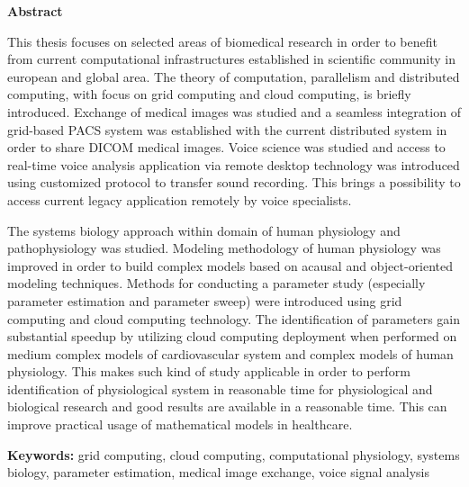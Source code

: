 
\newpage
\begin{center}
\Large \textbf{Abstract}
\end{center} 

\normalsize


This thesis focuses on selected areas of biomedical research in order to benefit from current computational infrastructures established in scientific community in european and global area. The theory of computation, parallelism and distributed computing, with focus on grid computing and cloud computing, is briefly introduced. Exchange of medical images was studied and a seamless integration of grid-based PACS system was established with the current distributed system in order to share DICOM medical images. Voice science was studied and access to real-time voice analysis application via remote desktop technology was introduced using customized protocol to transfer sound recording. This brings a possibility to access current legacy application remotely by voice specialists. 

The systems biology approach within domain of human physiology and pathophysiology was studied. Modeling methodology of human physiology was improved in order to build complex models based on acausal and object-oriented modeling techniques. Methods for conducting a parameter study (especially parameter estimation and parameter sweep) were introduced using grid computing and cloud computing technology. The identification of parameters gain substantial speedup by utilizing cloud computing deployment when performed on medium complex models of cardiovascular system and complex models of human physiology. This makes such kind of study applicable in order to perform identification of physiological system in reasonable time for physiological and biological research and good results are available in a reasonable time. This can improve practical usage of mathematical models in healthcare.

\textbf{Keywords:}
grid computing, cloud computing, computational physiology, systems biology, parameter estimation, medical image exchange, voice signal analysis


